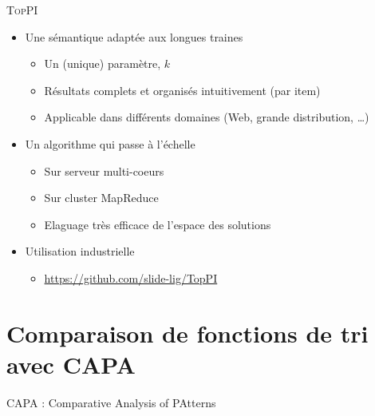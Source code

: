 \documentclass[table]{beamer}
\providecommand{\toppi}{\mbox{\textsc{TopPI}}}
\providecommand{\capa}{\mbox{\textsc{CAPA}} }
\begin{document}
\begin{frame}{\toppi}
  \begin{itemize}
    \item Une sémantique adaptée aux longues traines
      \begin{itemize}
        \item Un (unique) paramètre, $k$
        \item Résultats complets et organisés intuitivement (par item)
        \item Applicable dans différents domaines (Web, grande distribution, \ldots)
      \end{itemize}
    \vspace{1em}
    \item Un algorithme qui passe à l'échelle
    \begin{itemize}
      \item Sur serveur multi-coeurs
      \item Sur cluster MapReduce
      \item Elaguage très efficace de l'espace des solutions
    \end{itemize}
    \vspace{1em}
    \item Utilisation industrielle
      \begin{itemize}
        \item \url{https://github.com/slide-lig/TopPI}
      \end{itemize}
  \end{itemize}
\end{frame}


















\section{Comparaison de fonctions de tri avec \capa}
{
\begin{frame}{}
  \capa : Comparative Analysis of PAtterns
\end{frame}
}
\end{document}
